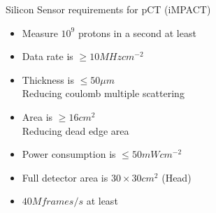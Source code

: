 \documentclass[a4paper,14pt]{article}
\begin{document}
Silicon Sensor requirements for pCT (iMPACT)
\begin{itemize}
    \item Measure $10^9$ protons in a second at least
    \item Data rate is $\geq 10 MHz cm^{-2}$
    \item Thickness is  $\leq 50 \mu m$
    \\Reducing coulomb multiple scattering
    \item Area is $\geq 16 cm^2$
    \\Reducing dead edge area
    \item Power consumption is $\leq 50 mW cm^{-2}$
    \item Full detector area is $30\times30 cm^2$ (Head)
    \item $40 Mframes/s$ at least
\end{itemize}
\end{document}
